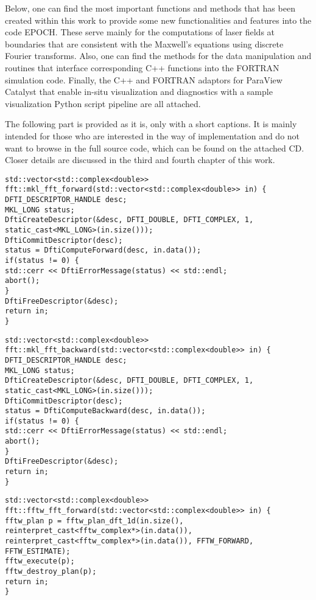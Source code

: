 Below, one can find the most important functions and methods that has been created within this work to provide some new functionalities and features into the code EPOCH. These serve mainly for the computations of laser fields at boundaries that are consistent with the Maxwell's equations using discrete Fourier transforms. Also, one can find the methods for the data manipulation and routines that interface corresponding C++ functions into the FORTRAN simulation code. Finally, the C++ and FORTRAN adaptors for ParaView Catalyst that enable in-situ visualization and diagnostics with a sample visualization Python script pipeline are all attached.

The following part is provided as it is, only with a short captions. It is mainly intended for those who are interested in the way of implementation and do not want to browse in the full source code, which can be found on the attached CD. Closer details are discussed in the third and fourth chapter of this work.

\begin{lstlisting}[style=CXX, caption=Function performing forward fast Fourier transform using Intel$ ^{\scriptsize \textregistered} $ MKL library]
std::vector<std::complex<double>> fft::mkl_fft_forward(std::vector<std::complex<double>> in) {
DFTI_DESCRIPTOR_HANDLE desc;
MKL_LONG status;
DftiCreateDescriptor(&desc, DFTI_DOUBLE, DFTI_COMPLEX, 1, static_cast<MKL_LONG>(in.size()));
DftiCommitDescriptor(desc);
status = DftiComputeForward(desc, in.data());
if(status != 0) {
std::cerr << DftiErrorMessage(status) << std::endl;
abort();
}
DftiFreeDescriptor(&desc);
return in;
}
\end{lstlisting}

\begin{lstlisting}[style=CXX, caption=Function performing backward fast Fourier transform using Intel$ ^{\scriptsize \textregistered} $ MKL library]
std::vector<std::complex<double>> fft::mkl_fft_backward(std::vector<std::complex<double>> in) {
DFTI_DESCRIPTOR_HANDLE desc;
MKL_LONG status;
DftiCreateDescriptor(&desc, DFTI_DOUBLE, DFTI_COMPLEX, 1, static_cast<MKL_LONG>(in.size()));
DftiCommitDescriptor(desc);
status = DftiComputeBackward(desc, in.data());
if(status != 0) {
std::cerr << DftiErrorMessage(status) << std::endl;
abort();
}
DftiFreeDescriptor(&desc);
return in;
}
\end{lstlisting}

\begin{lstlisting}[style=CXX, caption=Function performing forward fast Fourier transform using FFTW library]
std::vector<std::complex<double>> fft::fftw_fft_forward(std::vector<std::complex<double>> in) {
fftw_plan p = fftw_plan_dft_1d(in.size(), reinterpret_cast<fftw_complex*>(in.data()), reinterpret_cast<fftw_complex*>(in.data()), FFTW_FORWARD, FFTW_ESTIMATE);
fftw_execute(p);
fftw_destroy_plan(p);
return in;
}
\end{lstlisting}

